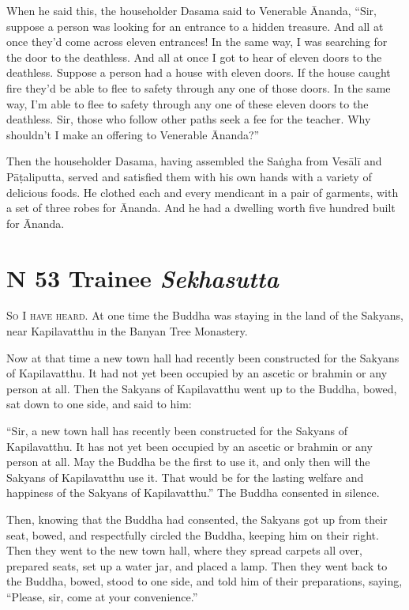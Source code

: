 \documentclass[12pt,openany]{book}%
\newcommand*{\suttatitleacronym}[1]{\smaller[2]{#1}\vspace*{.3em}}
\newcommand*{\suttatitletranslation}[1]{\linebreak{#1}}
\newcommand*{\suttatitleroot}[1]{\linebreak\smaller[2]\itshape{#1}}
\newcommand*{\tocacronym}[1]{\hspace*{-3.3em}{#1}\quad}
\newcommand*{\toctranslation}[1]{#1}
\newcommand*{\tocroot}[1]{(\textit{#1})}
\newcommand*{\scevam}[1]{\textsc{#1}}
\begin{document}
When he said this, the householder Dasama said to Venerable Ānanda, “Sir, suppose a person was looking for an entrance to a hidden treasure. And all at once they’d come across eleven entrances! In the same way, I was searching for the door to the deathless. And all at once I got to hear of eleven doors to the deathless. Suppose a person had a house with eleven doors. If the house caught fire they’d be able to flee to safety through any one of those doors. In the same way, I’m able to flee to safety through any one of these eleven doors to the deathless. Sir, those who follow other paths seek a fee for the teacher. Why shouldn’t I make an offering to Venerable Ānanda?” 

Then the householder Dasama, having assembled the \textsanskrit{Saṅgha} from \textsanskrit{Vesālī} and \textsanskrit{Pāṭaliputta}, served and satisfied them with his own hands with a variety of delicious foods. He clothed each and every mendicant in a pair of garments, with a set of three robes for Ānanda. And he had a dwelling worth five hundred built for Ānanda. 

%
\section*{{\suttatitleacronym MN 53}{\suttatitletranslation A Trainee }{\suttatitleroot Sekhasutta}}
\addcontentsline{toc}{section}{\tocacronym{MN 53} \toctranslation{A Trainee } \tocroot{Sekhasutta}}

\scevam{So I have heard. }At one time the Buddha was staying in the land of the Sakyans, near Kapilavatthu in the Banyan Tree Monastery. 

Now at that time a new town hall had recently been constructed for the Sakyans of Kapilavatthu. It had not yet been occupied by an ascetic or brahmin or any person at all. Then the Sakyans of Kapilavatthu went up to the Buddha, bowed, sat down to one side, and said to him: 

“Sir, a new town hall has recently been constructed for the Sakyans of Kapilavatthu. It has not yet been occupied by an ascetic or brahmin or any person at all. May the Buddha be the first to use it, and only then will the Sakyans of Kapilavatthu use it. That would be for the lasting welfare and happiness of the Sakyans of Kapilavatthu.” The Buddha consented in silence. 

Then, knowing that the Buddha had consented, the Sakyans got up from their seat, bowed, and respectfully circled the Buddha, keeping him on their right. Then they went to the new town hall, where they spread carpets all over, prepared seats, set up a water jar, and placed a lamp. Then they went back to the Buddha, bowed, stood to one side, and told him of their preparations, saying, “Please, sir, come at your convenience.” 
\end{document}
